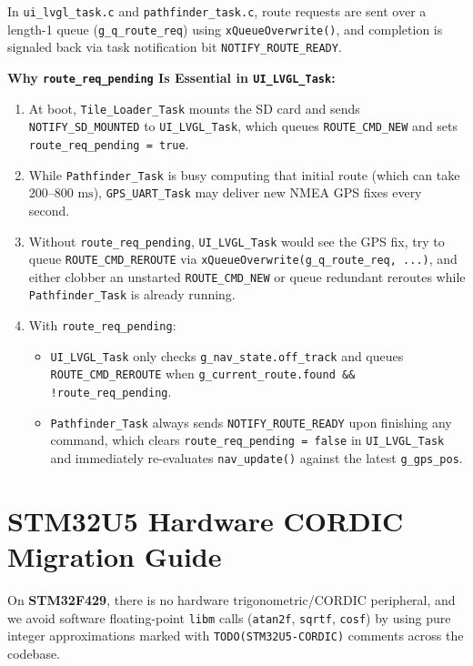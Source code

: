 \documentclass[11pt,a4paper]{article}
\begin{document}
In \texttt{ui\_lvgl\_task.c} and \texttt{pathfinder\_task.c}, route requests are sent over a length-1 queue (\texttt{g\_q\_route\_req}) using \texttt{xQueueOverwrite()}, and completion is signaled back via task notification bit \texttt{NOTIFY\_ROUTE\_READY}.

\textbf{Why \texttt{route\_req\_pending} Is Essential in \texttt{UI\_LVGL\_Task}:}
\begin{enumerate}
    \item At boot, \texttt{Tile\_Loader\_Task} mounts the SD card and sends \texttt{NOTIFY\_SD\_MOUNTED} to \texttt{UI\_LVGL\_Task}, which queues \texttt{ROUTE\_CMD\_NEW} and sets \texttt{route\_req\_pending = true}.
    \item While \texttt{Pathfinder\_Task} is busy computing that initial route (which can take $200\text{--}800\text{ ms}$), \texttt{GPS\_UART\_Task} may deliver new NMEA GPS fixes every second.
    \item Without \texttt{route\_req\_pending}, \texttt{UI\_LVGL\_Task} would see the GPS fix, try to queue \texttt{ROUTE\_CMD\_REROUTE} via \texttt{xQueueOverwrite(g\_q\_route\_req, ...)}, and either clobber an unstarted \texttt{ROUTE\_CMD\_NEW} or queue redundant reroutes while \texttt{Pathfinder\_Task} is already running.
    \item With \texttt{route\_req\_pending}:
    \begin{itemize}
        \item \texttt{UI\_LVGL\_Task} only checks \texttt{g\_nav\_state.off\_track} and queues \texttt{ROUTE\_CMD\_REROUTE} when \texttt{g\_current\_route.found \&\& !route\_req\_pending}.
        \item \texttt{Pathfinder\_Task} always sends \texttt{NOTIFY\_ROUTE\_READY} upon finishing any command, which clears \texttt{route\_req\_pending = false} in \texttt{UI\_LVGL\_Task} and immediately re-evaluates \texttt{nav\_update()} against the latest \texttt{g\_gps\_pos}.
    \end{itemize}
\end{enumerate}

\section{STM32U5 Hardware CORDIC Migration Guide}

On \textbf{STM32F429}, there is no hardware trigonometric/CORDIC peripheral, and we avoid software floating-point \texttt{libm} calls (\texttt{atan2f}, \texttt{sqrtf}, \texttt{cosf}) by using pure integer approximations marked with \texttt{TODO(STM32U5-CORDIC)} comments across the codebase.
\end{document}
